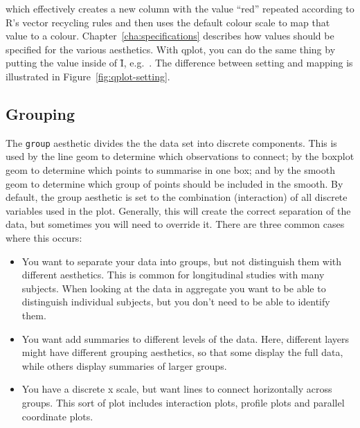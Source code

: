 % 


\noindent which effectively creates a new column with the value ``red'' repeated according to R's vector recycling rules and then uses the default colour scale to map that value to a colour. Chapter~\ref{cha:specifications} describes how values should be specified for the various aesthetics.  With qplot, you can do the same thing by putting the value inside of \f{I}, e.g.\ .  The difference between setting and mapping is illustrated in Figure~\ref{fig:qplot-setting}.  

% 


\subsection{Grouping}
\label{sub:grouping}

The {\tt group} aesthetic divides the the data set into discrete components.   This is used by the line geom to determine which observations to connect; by the boxplot geom to determine which points to summarise in one box; and by the smooth geom to determine which group of points should be included in the smooth. By default, the group aesthetic is set to the combination (interaction) of all discrete variables used in the plot.  Generally, this will create the correct separation of the data, but sometimes you will need to override it.  There are three common cases where this occurs:

\begin{itemize}
  \item You want to separate your data into groups, but not distinguish them with different aesthetics.  This is common for longitudinal studies with many subjects.  When looking at the data in aggregate you want to be able to distinguish individual subjects, but you don't need to be able to identify them.
  
  \item You want add summaries to different levels of the data. Here, different layers might have different grouping aesthetics, so that some display the full data, while others display summaries of larger groups.

  \item You have a discrete x scale, but want lines to connect horizontally across groups.  This sort of plot includes interaction plots, profile plots and parallel coordinate plots.  
  
\end{itemize}

